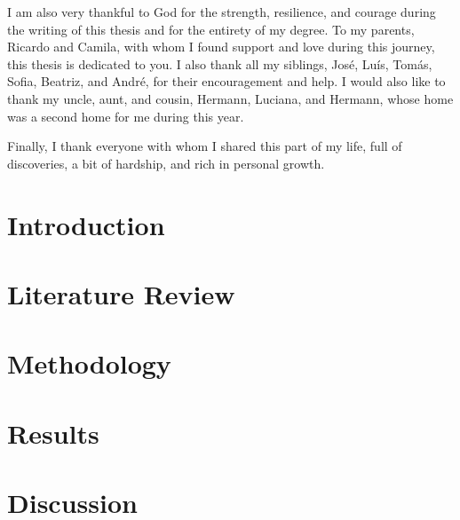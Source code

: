 I am also very thankful to God for the strength, resilience, and courage during the writing of this thesis and for the entirety of my degree. To my parents, Ricardo and Camila, with whom I found support and love during this journey, this thesis is dedicated to you. I also thank all my siblings, José, Luís, Tomás, Sofia, Beatriz, and André, for their encouragement and help. I would also like to thank my uncle, aunt, and cousin, Hermann, Luciana, and Hermann, whose home was a second home for me during this year.

Finally, I thank everyone with whom I shared this part of my life, full of discoveries, a bit of hardship, and rich in personal growth. 



\tableofcontents

\listoffigures

\listoftables

\listofalgorithms

\clearpage

\printglossary[type=\acronymtype,title=Glossary]

\clearpage


\chapter{Introduction} \label{ch:intro}



\chapter{Literature Review} \label{ch:lit}



\chapter{Methodology} \label{ch:method}



\chapter{Results} \label{ch:results}



\chapter{Discussion} \label{ch:discussion}



